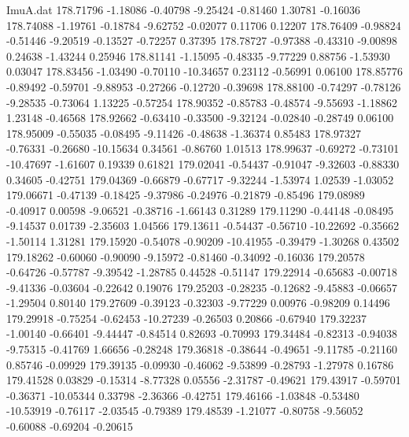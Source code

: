 \begin{filecontents}{ImuA.dat}
 178.71796   -1.18086   -0.40798   -9.25424   -0.81460    1.30781   -0.16036
 178.74088   -1.19761   -0.18784   -9.62752   -0.02077    0.11706    0.12207
 178.76409   -0.98824   -0.51446   -9.20519   -0.13527   -0.72257    0.37395
 178.78727   -0.97388   -0.43310   -9.00898    0.24638   -1.43244    0.25946
 178.81141   -1.15095   -0.48335   -9.77229    0.88756   -1.53930    0.03047
 178.83456   -1.03490   -0.70110  -10.34657    0.23112   -0.56991    0.06100
 178.85776   -0.89492   -0.59701   -9.88953   -0.27266   -0.12720   -0.39698
 178.88100   -0.74297   -0.78126   -9.28535   -0.73064    1.13225   -0.57254
 178.90352   -0.85783   -0.48574   -9.55693   -1.18862    1.23148   -0.46568
 178.92662   -0.63410   -0.33500   -9.32124   -0.02840   -0.28749    0.06100
 178.95009   -0.55035   -0.08495   -9.11426   -0.48638   -1.36374    0.85483
 178.97327   -0.76331   -0.26680  -10.15634    0.34561   -0.86760    1.01513
 178.99637   -0.69272   -0.73101  -10.47697   -1.61607    0.19339    0.61821
 179.02041   -0.54437   -0.91047   -9.32603   -0.88330    0.34605   -0.42751
 179.04369   -0.66879   -0.67717   -9.32244   -1.53974    1.02539   -1.03052
 179.06671   -0.47139   -0.18425   -9.37986   -0.24976   -0.21879   -0.85496
 179.08989   -0.40917    0.00598   -9.06521   -0.38716   -1.66143    0.31289
 179.11290   -0.44148   -0.08495   -9.14537    0.01739   -2.35603    1.04566
 179.13611   -0.54437   -0.56710  -10.22692   -0.35662   -1.50114    1.31281
 179.15920   -0.54078   -0.90209  -10.41955   -0.39479   -1.30268    0.43502
 179.18262   -0.60060   -0.90090   -9.15972   -0.81460   -0.34092   -0.16036
 179.20578   -0.64726   -0.57787   -9.39542   -1.28785    0.44528   -0.51147
 179.22914   -0.65683   -0.00718   -9.41336   -0.03604   -0.22642    0.19076
 179.25203   -0.28235   -0.12682   -9.45883   -0.06657   -1.29504    0.80140
 179.27609   -0.39123   -0.32303   -9.77229    0.00976   -0.98209    0.14496
 179.29918   -0.75254   -0.62453  -10.27239   -0.26503    0.20866   -0.67940
 179.32237   -1.00140   -0.66401   -9.44447   -0.84514    0.82693   -0.70993
 179.34484   -0.82313   -0.94038   -9.75315   -0.41769    1.66656   -0.28248
 179.36818   -0.38644   -0.49651   -9.11785   -0.21160    0.85746   -0.09929
 179.39135   -0.09930   -0.46062   -9.53899   -0.28793   -1.27978    0.16786
 179.41528    0.03829   -0.15314   -8.77328    0.05556   -2.31787   -0.49621
 179.43917   -0.59701   -0.36371  -10.05344    0.33798   -2.36366   -0.42751
 179.46166   -1.03848   -0.53480  -10.53919   -0.76117   -2.03545   -0.79389
 179.48539   -1.21077   -0.80758   -9.56052   -0.60088   -0.69204   -0.20615

\end{filecontents}
